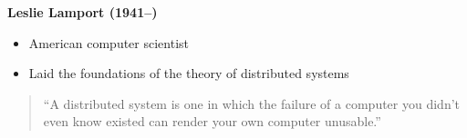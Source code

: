{
\begin{frame}[plain,t]
\vfill
\begin{minipage}{.45\textwidth}
\hspace{1em}\textbf{\large Leslie Lamport (1941--)}
\begin{itemize}
\item American computer scientist
\item Laid the foundations of the theory of distributed systems
\end{itemize}

\bigskip

\begin{quote}
``A distributed system is one in which the failure of a computer you didn't even know existed can render your own computer unusable.''\end{quote}
\end{minipage}
\end{frame}
}


